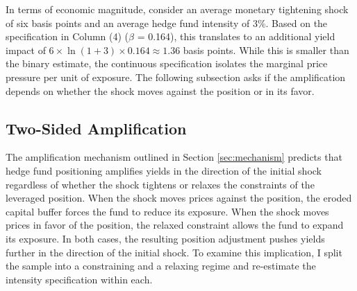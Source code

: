\documentclass[english, 11pt, oneside]{article}
\begin{document}
In terms of economic magnitude, consider an average monetary tightening shock of six basis points and an average hedge fund intensity of 3\%. Based on the specification in Column (4) ($\beta$ = 0.164), this translates to an additional yield impact of $6 \times \ln(1 + 3) \times 0.164 \approx 1.36$ basis points. While this is smaller than the binary estimate, the continuous specification isolates the marginal price pressure per unit of exposure. The following subsection asks if the amplification depends on whether the shock moves against the position or in its favor.



\subsection{Two-Sided Amplification}
\label{subsec:asymmetries}

The amplification mechanism outlined in Section \ref{sec:mechanism} predicts that hedge fund positioning amplifies yields in the direction of the initial shock regardless of whether the shock tightens or relaxes the constraints of the leveraged position. When the shock moves prices against the position, the eroded capital buffer forces the fund to reduce its exposure. When the shock moves prices in favor of the position, the relaxed constraint allows the fund to expand its exposure. In both cases, the resulting position adjustment pushes yields further in the direction of the initial shock. To examine this implication, I split the sample into a constraining and a relaxing regime and re-estimate the intensity specification within each.
\end{document}
